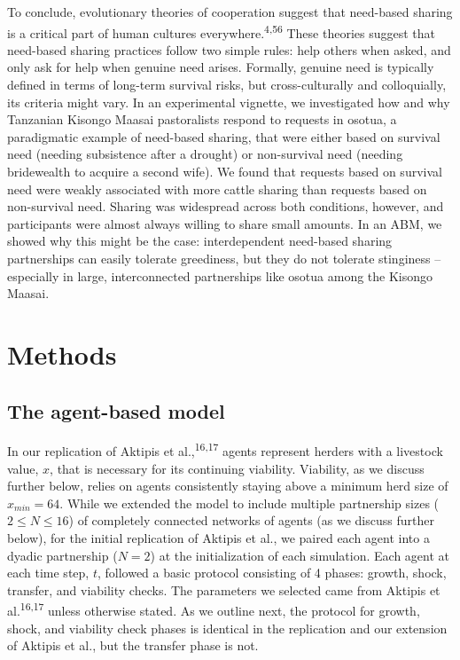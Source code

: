 \documentclass[
]{article}
\begin{document}
To conclude, evolutionary theories of cooperation suggest that need-based sharing is a critical part of human cultures everywhere.\textsuperscript{4,56} These theories suggest that need-based sharing practices follow two simple rules: help others when asked, and only ask for help when genuine need arises. Formally, genuine need is typically defined in terms of long-term survival risks, but cross-culturally and colloquially, its criteria might vary. In an experimental vignette, we investigated how and why Tanzanian Kisongo Maasai pastoralists respond to requests in osotua, a paradigmatic example of need-based sharing, that were either based on survival need (needing subsistence after a drought) or non-survival need (needing bridewealth to acquire a second wife). We found that requests based on survival need were weakly associated with more cattle sharing than requests based on non-survival need. Sharing was widespread across both conditions, however, and participants were almost always willing to share small amounts. In an ABM, we showed why this might be the case: interdependent need-based sharing partnerships can easily tolerate greediness, but they do not tolerate stinginess -- especially in large, interconnected partnerships like osotua among the Kisongo Maasai.

\section*{Methods}\label{themethods}

\subsection*{The agent-based model}\label{abmmethods}

In our replication of Aktipis et al.,\textsuperscript{16,17} agents represent herders with a livestock value, \(x\), that is necessary for its continuing viability. Viability, as we discuss further below, relies on agents consistently staying above a minimum herd size of \(x_{min} = 64\). While we extended the model to include multiple partnership sizes (\(2 \le N \le 16\)) of completely connected networks of agents (as we discuss further below), for the initial replication of Aktipis et al., we paired each agent into a dyadic partnership (\(N=2\)) at the initialization of each simulation. Each agent at each time step, \(t\), followed a basic protocol consisting of 4 phases: growth, shock, transfer, and viability checks. The parameters we selected came from Aktipis et al.\textsuperscript{16,17} unless otherwise stated. As we outline next, the protocol for growth, shock, and viability check phases is identical in the replication and our extension of Aktipis et al., but the transfer phase is not.
\end{document}
